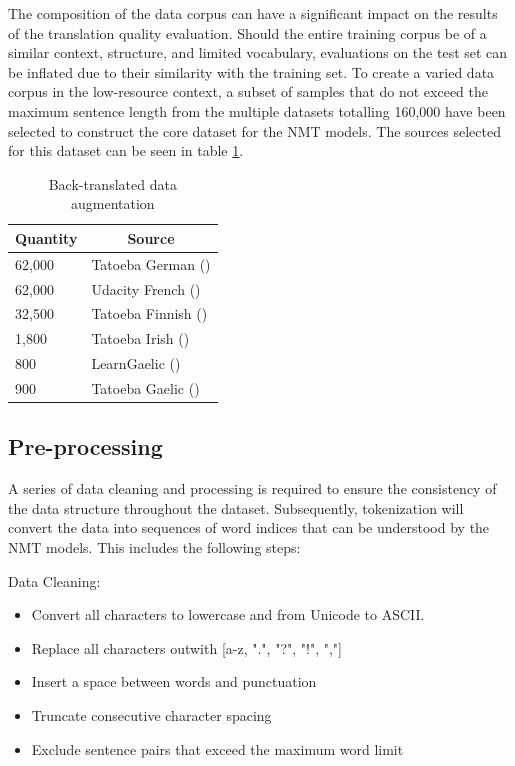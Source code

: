 The composition of the data corpus can have a significant impact on the results of the translation quality evaluation. Should the entire training corpus be of a similar context, structure, and limited vocabulary, evaluations on the test set can be inflated due to their similarity with the training set.
To create a varied data corpus in the low-resource context, a subset of samples that do not exceed the maximum sentence length from the multiple datasets totalling 160,000 have been selected to construct the core dataset for the \acrshort{NMT} models. The sources selected for this dataset can be seen in table \ref{tab:low_resource-data}.

\begin{table}[!ht]
\centering
\begin{tabular}{|l|l|}
\hline
\multicolumn{1}{|c|}{\textbf{Quantity}} & \multicolumn{1}{|c|}{\textbf{Source}} \\ \hline
62,000  & Tatoeba German (\cite{tatoeba_data_2020}) \\ \hline %
62,000  & Udacity French (\cite{udacity_data_2020}) \\ \hline %
32,500  & Tatoeba Finnish (\cite{udacity_data_2020}) \\ \hline %
1,800   & Tatoeba Irish (\cite{tatoeba_data_2020}) \\ \hline
800     & LearnGaelic (\cite{learn_gaelic_2019}) \\ \hline
900     & Tatoeba Gaelic (\cite{tatoeba_data_2020}) \\ \hline
\end{tabular}
\captionsetup{justification=centering,font=Large}
\caption{Back-translated data augmentation}
\label{tab:low_resource-data}
\end{table}

\subsection{Pre-processing}

A series of data cleaning and processing is required to ensure the consistency of the data structure throughout the dataset. Subsequently, tokenization will convert the data into sequences of word indices that can be understood by the \acrshort{NMT} models. This includes the following steps:

Data Cleaning:
\begin{itemize}
    \item Convert all characters to lowercase and from Unicode to ASCII. %
    \item Replace all characters outwith [a-z, ".", "?", "!", ","]
    \item Insert a space between words and punctuation
    \item Truncate consecutive character spacing
    \item Exclude sentence pairs that exceed the maximum word limit
\end{itemize}

